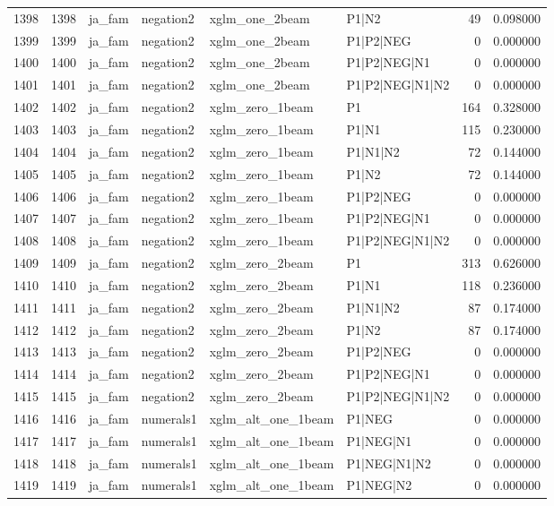 \begin{tabular}{lrllllrr}
1398 & 1398 & ja_fam & negation2 & xglm_one_2beam & P1|N2 & 49 & 0.098000 \\
1399 & 1399 & ja_fam & negation2 & xglm_one_2beam & P1|P2|NEG & 0 & 0.000000 \\
1400 & 1400 & ja_fam & negation2 & xglm_one_2beam & P1|P2|NEG|N1 & 0 & 0.000000 \\
1401 & 1401 & ja_fam & negation2 & xglm_one_2beam & P1|P2|NEG|N1|N2 & 0 & 0.000000 \\
1402 & 1402 & ja_fam & negation2 & xglm_zero_1beam & P1 & 164 & 0.328000 \\
1403 & 1403 & ja_fam & negation2 & xglm_zero_1beam & P1|N1 & 115 & 0.230000 \\
1404 & 1404 & ja_fam & negation2 & xglm_zero_1beam & P1|N1|N2 & 72 & 0.144000 \\
1405 & 1405 & ja_fam & negation2 & xglm_zero_1beam & P1|N2 & 72 & 0.144000 \\
1406 & 1406 & ja_fam & negation2 & xglm_zero_1beam & P1|P2|NEG & 0 & 0.000000 \\
1407 & 1407 & ja_fam & negation2 & xglm_zero_1beam & P1|P2|NEG|N1 & 0 & 0.000000 \\
1408 & 1408 & ja_fam & negation2 & xglm_zero_1beam & P1|P2|NEG|N1|N2 & 0 & 0.000000 \\
1409 & 1409 & ja_fam & negation2 & xglm_zero_2beam & P1 & 313 & 0.626000 \\
1410 & 1410 & ja_fam & negation2 & xglm_zero_2beam & P1|N1 & 118 & 0.236000 \\
1411 & 1411 & ja_fam & negation2 & xglm_zero_2beam & P1|N1|N2 & 87 & 0.174000 \\
1412 & 1412 & ja_fam & negation2 & xglm_zero_2beam & P1|N2 & 87 & 0.174000 \\
1413 & 1413 & ja_fam & negation2 & xglm_zero_2beam & P1|P2|NEG & 0 & 0.000000 \\
1414 & 1414 & ja_fam & negation2 & xglm_zero_2beam & P1|P2|NEG|N1 & 0 & 0.000000 \\
1415 & 1415 & ja_fam & negation2 & xglm_zero_2beam & P1|P2|NEG|N1|N2 & 0 & 0.000000 \\
1416 & 1416 & ja_fam & numerals1 & xglm_alt_one_1beam & P1|NEG & 0 & 0.000000 \\
1417 & 1417 & ja_fam & numerals1 & xglm_alt_one_1beam & P1|NEG|N1 & 0 & 0.000000 \\
1418 & 1418 & ja_fam & numerals1 & xglm_alt_one_1beam & P1|NEG|N1|N2 & 0 & 0.000000 \\
1419 & 1419 & ja_fam & numerals1 & xglm_alt_one_1beam & P1|NEG|N2 & 0 & 0.000000 \\

\end{tabular}
